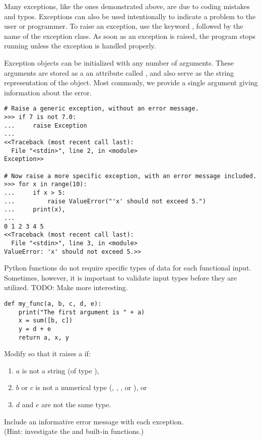 Many exceptions, like the ones demonstrated above, are due to coding mistakes and typos.
Exceptions can also be used intentionally to indicate a problem to the user or programmer.
To raise an exception, use the keyword , followed by the name of the exception class.
As soon as an exception is raised, the program stops running unless the exception is handled properly.

Exception objects can be initialized with any number of arguments.
These arguments are stored as a an attribute called , and also serve as the string representation of the object.
Most commonly, we provide a single argument giving information about the error.

\begin{lstlisting}
# Raise a generic exception, without an error message.
>>> if 7 is not 7.0:
...     raise Exception
... 
<<Traceback (most recent call last):
  File "<stdin>", line 2, in <module>
Exception>>

# Now raise a more specific exception, with an error message included.
>>> for x in range(10):
...     if x > 5:
...         raise ValueError("'x' should not exceed 5.")
...     print(x),
... 
0 1 2 3 4 5
<<Traceback (most recent call last):
  File "<stdin>", line 3, in <module>
ValueError: 'x' should not exceed 5.>>
\end{lstlisting}

\begin{problem} %
Python functions do not require specific types of data for each functional input.
Sometimes, however, it is important to validate input types before they are utilized. TODO: Make  more interesting.
\begin{lstlisting}
def my_func(a, b, c, d, e):
    print("The first argument is " + a)
    x = sum([b, c])
    y = d + e
    return a, x, y
\end{lstlisting}
Modify  so that it raises a  if:
\begin{enumerate}
\item $a$ is not a string (of type ),
\item $b$ or $c$ is not a numerical type (, , , or ), or
\item $d$ and $e$ are not the same type.
\end{enumerate}
Include an informative error message with each exception.
\\
(Hint: investigate the  and  built-in functions.)
\end{problem}

